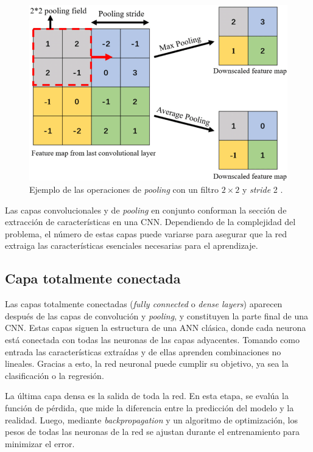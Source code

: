 \begin{figure}[h]
    \centering
    \includegraphics[width=\linewidth]{figures/2_theory/poolingExample.png}
    \caption[Ejemplo del operador de pooling]{Ejemplo de las operaciones de \textit{pooling} con un filtro $2\times2$ y \textit{stride} 2 \cite{pooling}.}
    \label{fig:poolingExample}
\end{figure}

Las capas convolucionales y de \textit{pooling} en conjunto conforman la sección de extracción de características en una CNN. Dependiendo de la complejidad del problema, el número de estas capas puede variarse para asegurar que la red extraiga las características esenciales necesarias para el aprendizaje.

\subsection{Capa totalmente conectada}
Las capas totalmente conectadas (\textit{fully connected} o \textit{dense layers}) aparecen después de las capas de convolución y \textit{pooling}, y constituyen la parte final de una CNN. Estas capas siguen la estructura de una ANN clásica, donde cada neurona está conectada con todas las neuronas de las capas adyacentes. Tomando como entrada las características extraídas y de ellas aprenden combinaciones no lineales. Gracias a esto, la red neuronal puede cumplir su objetivo, ya sea la clasificación o la regresión.

La última capa densa es la salida de toda la red. En esta etapa, se evalúa la función de pérdida, que mide la diferencia entre la predicción del modelo y la realidad. Luego, mediante \textit{backpropagation} y un algoritmo de optimización, los pesos de todas las neuronas de la red se ajustan durante el entrenamiento para minimizar el error.

